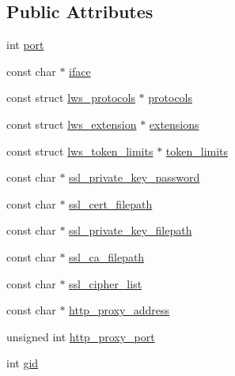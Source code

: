 \subsection*{Public Attributes}
\begin{DoxyCompactItemize}
\item 
int \hyperlink{structlws__context__creation__info_a424a5ce268d6903e42243be94487ab85}{port}
\item 
const char $\ast$ \hyperlink{structlws__context__creation__info_a360147555be7a3a904be1b9cd97266d6}{iface}
\item 
const struct \hyperlink{structlws__protocols}{lws\+\_\+protocols} $\ast$ \hyperlink{structlws__context__creation__info_a2f2b38d90864e3cdea64b5ebc7ecba8d}{protocols}
\item 
const struct \hyperlink{structlws__extension}{lws\+\_\+extension} $\ast$ \hyperlink{structlws__context__creation__info_a441e436acc5a816ab38a705ca9d11b72}{extensions}
\item 
const struct \hyperlink{structlws__token__limits}{lws\+\_\+token\+\_\+limits} $\ast$ \hyperlink{structlws__context__creation__info_ad86e64146c2003f3d551da22b369d0bf}{token\+\_\+limits}
\item 
const char $\ast$ \hyperlink{structlws__context__creation__info_ae534add81f6d3086310cfeb2d2a1f266}{ssl\+\_\+private\+\_\+key\+\_\+password}
\item 
const char $\ast$ \hyperlink{structlws__context__creation__info_a0ebe001c71365426d112977874bfded1}{ssl\+\_\+cert\+\_\+filepath}
\item 
const char $\ast$ \hyperlink{structlws__context__creation__info_a2e3413d0c73946f35c162d4a56ba7d09}{ssl\+\_\+private\+\_\+key\+\_\+filepath}
\item 
const char $\ast$ \hyperlink{structlws__context__creation__info_a83e6833230eca2ff8b108563303c70c6}{ssl\+\_\+ca\+\_\+filepath}
\item 
const char $\ast$ \hyperlink{structlws__context__creation__info_aeae5fe9ccc9b0ec6313a4bbf371f302a}{ssl\+\_\+cipher\+\_\+list}
\item 
const char $\ast$ \hyperlink{structlws__context__creation__info_aafc0e5d17c33f3a4a75df446b46a548b}{http\+\_\+proxy\+\_\+address}
\item 
unsigned int \hyperlink{structlws__context__creation__info_a7b59f2bdc869871e7bde232db94f5ca6}{http\+\_\+proxy\+\_\+port}
\item 
int \hyperlink{structlws__context__creation__info_a9c9d22437de92c197f3cee52912b2c03}{gid}
\item 

\end{DoxyCompactItemize}
